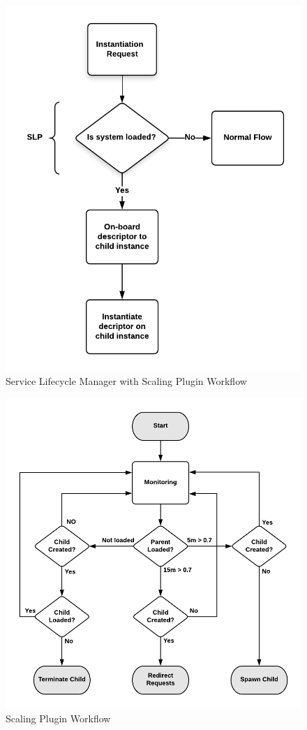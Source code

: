\begin{figure}[h]
	\centering
	\includegraphics[width=0.8\linewidth]{figures/SLPSLMWorkflow}
	\caption{Service Lifecycle Manager with Scaling Plugin Workflow}
	\label{fig:slpslmworkflow}
\end{figure}


\begin{figure}[h]
	\centering
	\includegraphics[width=1\linewidth]{figures/SPLWorkflow}
	\caption{Scaling Plugin Workflow}
	\label{fig:splworkflow}
\end{figure}


